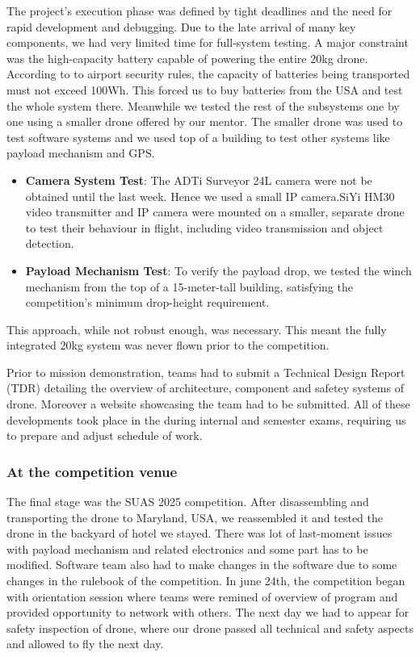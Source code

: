 The project's execution phase was defined by tight deadlines and the need for rapid development and debugging. Due to the late arrival of many key components, we had very limited time for full-system testing. A major constraint was the high-capacity battery capable of powering the entire 20kg drone. According to to airport security rules, the capacity of batteries being transported must not exceed 100Wh. This forced us to buy batteries from the USA and test the whole system there. Meanwhile we tested the rest of the subsystems one by one using a smaller drone offered by our mentor. The smaller drone was used to test software systems and we used top of a building to test other systems like payload mechanism and GPS.
\begin{itemize}
	\item \textbf{Camera System Test}: The ADTi Surveyor 24L camera were not be obtained until the last week. Hence we used a small IP camera.SiYi HM30 video transmitter and IP camera were mounted on a smaller, separate drone to test their behaviour in flight, including video transmission and object detection.
	\item \textbf {Payload Mechanism Test}: To verify the payload drop, we tested the winch mechanism from the top of a 15-meter-tall building, satisfying the competition's minimum drop-height requirement.
\end{itemize}

This approach, while not robust enough, was necessary. This meant the fully integrated 20kg system was never flown prior to the competition.

Prior to mission demonstration, teams had to submit a Technical Design Report (TDR) detailing the overview of architecture, component and safetey systems of drone. Moreover a website showcasing the team had to be submitted. All of these developments took place in the during internal and semester exams, requiring us to prepare and adjust schedule of work.

\subsubsection{At the competition venue}
The final stage was the SUAS 2025 competition. After disassembling and transporting the drone to Maryland, USA, we reassembled it and tested the drone in the backyard of hotel we stayed. There was lot of last-moment issues with payload mechanism and related electronics and some part has to be modified. Software team also had to make changes in the software due to some changes in the rulebook of the competition. In june 24th, the competition began with orientation session where teams were remined of overview of program and provided opportunity to network with others. The next day we had to appear for safety inspection of drone, where our drone passed all technical and safety aspects and allowed to fly the next day.

